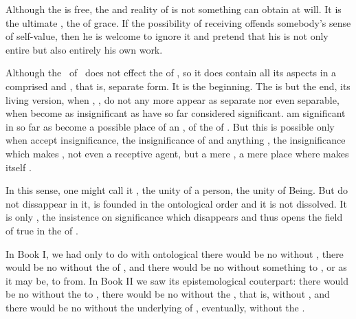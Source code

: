 Although the  is free, the  and
reality of  is not something  can obtain at will. It is
the ultimate , the  of grace. If the possibility of receiving
 offends somebody's sense of self-value, then he is welcome
to ignore it and pretend that his  is not only entire
but also entirely his own work.


\pa Although the \sch\ of \yes\ does not effect the  of
, so it does contain all its aspects in a comprised and
, that is, separate form.  It is the beginning.  The
 is but the end, its living version, when ,
,  do not any more appear as separate nor
even separable, when  become as insignificant as 
have so far considered  significant.   am significant
in so far as  become a possible place of an , of the  of .  But
this  is possible only when  accept 
insignificance, the insignificance of  and anything
, the insignificance which makes , not even a
receptive agent, but a mere , a mere place where 
makes itself .

In this sense, one might call it , the unity of a person, 
the unity of Being.  
But  do not dissappear in it,  is founded in
the ontological order and it is not dissolved.  It is only
, the insistence on  significance which
disappears and thus opens the field of true  in the
 of .



\pa In Book I, we had only to do with ontological  there
would be no  without , there would be
no  without the  of , and
there would be no  without something to
, or as it may be, to  from.  In Book
II we saw its epistemological couterpart: there would be no
 without the  to , there
would be no  without the , that is,
without , and there would be no  without the
underlying  of , eventually, without
the .


